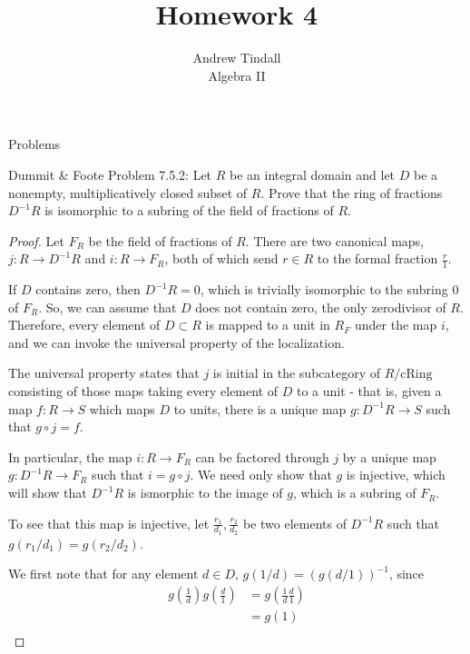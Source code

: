 \documentclass[12pt]{article}
\theoremstyle{definition}
\newenvironment{problem}[2][Problem]{\begin{trivlist}
\item[\hskip \labelsep {\bfseries #1}\hskip \labelsep {\bfseries #2.}]}{\end{trivlist}}
\begin{document}
 
 
\title{Homework 4}
\author{Andrew Tindall\\
	Algebra II}
 
\maketitle
\begin{section}{Problems}
\begin{problem}{1}
Dummit \& Foote Problem 7.5.2: Let $R$ be an integral domain and let $D$ be a nonempty, multiplicatively closed subset of $R$. Prove that the ring of fractions $D^{-1}R$ is isomorphic to a subring of the field of fractions of $R$.
\end{problem}
\begin{proof}
Let $F_R$ be the field of fractions of $R$. There are two canonical maps, $j : R \to D^{-1}R$ and $i : R \to F_R$, both of which send $r \in R$ to the formal fraction $\frac{r}{1}$. 
\par If $D$ contains zero, then $D^{-1}R = 0$, which is trivially isomorphic to the subring $0$ of $F_R$. So, we can assume that $D$ does not contain zero, the only zerodivisor of $R$. Therefore, every element of $D \subset R$ is mapped to a unit in $R_F$ under the map $i$, and we can invoke the  universal property of the localization.
\par The universal property states that $j$ is initial in the subcategory of $R/\text{cRing}$ consisting of those maps taking every element of $D$ to a unit - that is, given a map $f: R \to S$ which maps $D$ to units, there is a unique map $g : D^{-1}R \to S$ such that $g \circ j = f$. 
\par In particular, the map $i : R \to F_R$ can be factored through $j$ by a unique map $g : D^{-1}R \to F_R$ such that $i = g \circ j$. We need only show that $g$ is injective, which will show that $D^{-1}R$ is ismorphic to the image of $g$, which is a subring of $F_R$. 
\par To see that this map is injective, let $\frac{r_1}{d_1}, \frac{r_2}{d_2}$ be two elements of $D^{-1}R$ such that $g(r_1/d_1) = g (r_2/d_2)$.
\par We first note that for any element $d \in D$, $g(1/d) = (g(d/1))^{-1}$, since 
\begin{align*}
    g \left (\frac{1}{d} \right )g \left (\frac{d}{1} \right) &= g \left ( \frac{1}{d} \frac{d}{1} \right )\\
    &= g(1)\\

\end{align*}
\end{proof}
\end{section}
\end{document}
